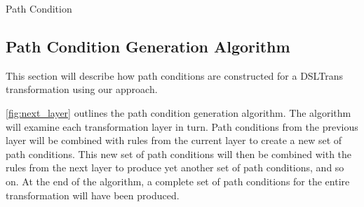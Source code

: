 \begin{definition}{Path Condition\\}
\label{def:path_condition}
\end{definition}




\subsection{Path Condition Generation Algorithm}
\label{sec:gen_all_pcs}

 This section will describe how path conditions are constructed for a DSLTrans transformation using our approach.

\cref{fig:next_layer} outlines the path condition generation algorithm. The algorithm will examine each transformation layer in turn. Path conditions from the previous layer will be combined with rules from the current layer to create a new set of path conditions. This new set of path conditions will then be combined with the rules from the next layer to produce yet another set of path conditions, and so on. At the end of the algorithm, a complete set of path conditions for the entire transformation will have been produced. 

